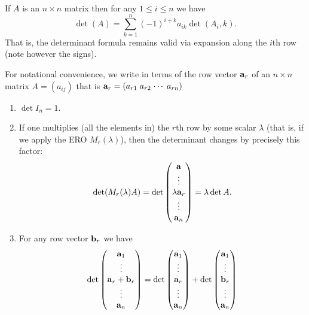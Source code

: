 \documentclass[10pt, a4paper]{article}
\begin{document}
\begin{lemma}
    If $A$ is an $n \times n$ matrix then for any $1 \leq i \leq n$ we have
    \[
    \det(A) = \sum_{k = 1}^{n}(-1) ^ {i + k}a_{ik}\det(A_i, k).
    \]
    That is,
    the determinant formula remains valid via expansion along the $i$th row
    (note however the signs).
\end{lemma}

\begin{proposition}
    For notational convenience,
    we write in terms of the row vector $\mathbf{a}_r$ of an $n \times n$ matrix $A = (a_{ij})$ that is $\mathbf{a}_r = (a_{r1}\; a_{r2}\; \dotsi \; a_{rn})$
    \begin{enumerate}[label = (\roman*)]
        \item $\det I_n = 1$.
        \item If one multiplies
        (all the elements in)
        the $r$th row by some scalar $\lambda$
        (that is, if we apply the ERO $M_r(\lambda)$),
        then the determinant changes by precisely this factor:
        \[
        \det(M_r(\lambda)A) = \det\begin{pmatrix}
            \mathbf{a} \\ \vdots \\ \lambda\mathbf{a}_r \\ \vdots \\ \mathbf{a}_n
        \end{pmatrix} = \lambda\det A.
        \]
        \item For any row vector $\mathbf{b}_r$ we have
        \[
        \det\begin{pmatrix}
            \mathbf{a}_1 \\ \vdots \\ \mathbf{a}_r + \mathbf{b}_r \\ \vdots \\ \mathbf{a}_n
        \end{pmatrix} =
        \det \begin{pmatrix}
            \mathbf{a}_1 \\ \vdots \\ \mathbf{a}_r \\ \vdots \\ \mathbf{a}_n
        \end{pmatrix}
        +
        \det\begin{pmatrix}
            \mathbf{a}_1 \\ \vdots \\ \mathbf{b}_r \\ \vdots \\ \mathbf{a}_n

\end{pmatrix}\]
\end{enumerate}
\end{proposition}
\end{document}
